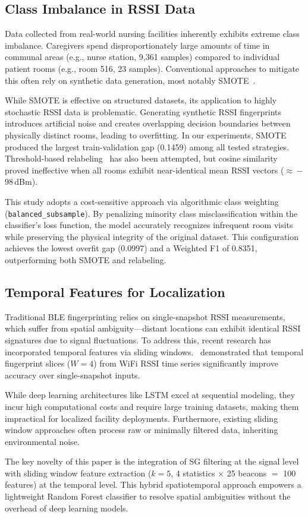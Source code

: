 \subsection{Class Imbalance in RSSI Data}

Data collected from real-world nursing facilities inherently exhibits extreme class imbalance. Caregivers spend disproportionately large amounts of time in communal areas (e.g., nurse station, 9,361 samples) compared to individual patient rooms (e.g., room 516, 23 samples). Conventional approaches to mitigate this often rely on synthetic data generation, most notably SMOTE~\cite{chawla2002}.

While SMOTE is effective on structured datasets, its application to highly stochastic RSSI data is problematic. Generating synthetic RSSI fingerprints introduces artificial noise and creates overlapping decision boundaries between physically distinct rooms, leading to overfitting. In our experiments, SMOTE produced the largest train-validation gap (0.1459) among all tested strategies. Threshold-based relabeling~\cite{garcia2024} has also been attempted, but cosine similarity proved ineffective when all rooms exhibit near-identical mean RSSI vectors ($\approx$\,$-$98\,dBm).

This study adopts a cost-sensitive approach via algorithmic class weighting (\texttt{balanced\_subsample}). By penalizing minority class misclassification within the classifier's loss function, the model accurately recognizes infrequent room visits while preserving the physical integrity of the original dataset. This configuration achieves the lowest overfit gap (0.0997) and a Weighted F1 of 0.8351, outperforming both SMOTE and relabeling.

\subsection{Temporal Features for Localization}

Traditional BLE fingerprinting relies on single-snapshot RSSI measurements, which suffer from spatial ambiguity—distant locations can exhibit identical RSSI signatures due to signal fluctuations. To address this, recent research has incorporated temporal features via sliding windows.~\citet{sensors2023} demonstrated that temporal fingerprint slices ($W=4$) from WiFi RSSI time series significantly improve accuracy over single-snapshot inputs.

While deep learning architectures like LSTM excel at sequential modeling, they incur high computational costs and require large training datasets, making them impractical for localized facility deployments. Furthermore, existing sliding window approaches often process raw or minimally filtered data, inheriting environmental noise.

The key novelty of this paper is the integration of SG filtering at the signal level with sliding window feature extraction ($k=5$, 4 statistics $\times$ 25 beacons $=$ 100 features) at the temporal level. This hybrid spatiotemporal approach empowers a lightweight Random Forest classifier to resolve spatial ambiguities without the overhead of deep learning models.
